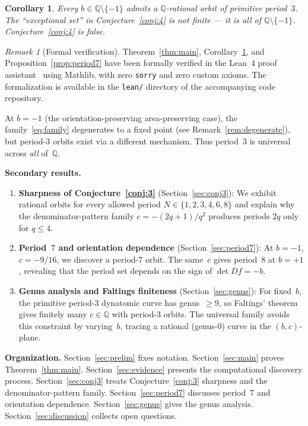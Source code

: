 \documentclass[11pt]{article}
\newtheorem{corollary}[theorem]{Corollary}
\theoremstyle{definition}
\theoremstyle{remark}
\newtheorem{remark}[theorem]{Remark}
\begin{document}
\begin{corollary}\label{cor:conj4false}
  Every $b \in \mathbb{Q} \setminus \{-1\}$ admits a $\mathbb{Q}$-rational orbit
  of primitive period~$3$.  The ``exceptional set'' in Conjecture~\ref{conj:4} is not
  finite --- it is all of $\mathbb{Q} \setminus \{-1\}$.
  Conjecture~\ref{conj:4} is false.
\end{corollary}

\begin{remark}[Formal verification]\label{rem:lean}
  Theorem~\ref{thm:main}, Corollary~\ref{cor:conj4false}, and
  Proposition~\ref{prop:period7} have been formally verified in the
  Lean~4 proof assistant~\cite{lean4} using Mathlib, with zero \texttt{sorry}
  and zero custom axioms.  The formalization is available in the
  \texttt{lean/} directory of the accompanying code repository.
\end{remark}

At $b = -1$ (the orientation-preserving area-preserving case),
the family~\eqref{eq:family} degenerates to a fixed point (see
Remark~\ref{rem:degenerate}), but period-$3$ orbits exist via a different mechanism.
Thus period~$3$ is universal across \emph{all} of~$\mathbb{Q}$.

\smallskip
\noindent\textbf{Secondary results.}
\begin{enumerate}
  \item \textbf{Sharpness of Conjecture~\ref{conj:3}}
  (Section~\ref{sec:conj3}):
  We exhibit rational orbits for every allowed period $N \in \{1,2,3,4,6,8\}$ and
  explain why the denominator-pattern family $c = -(2q+1)/q^2$ produces periods
  $2q$ only for $q \leq 4$.

  \item \textbf{Period~$7$ and orientation dependence}
  (Section~\ref{sec:period7}):
  At $b = -1$, $c = -9/16$, we discover a period-$7$ orbit.
  The same~$c$ gives period~$8$ at $b = +1$, revealing that the
  period set depends on the sign of $\det Df = -b$.

  \item \textbf{Genus analysis and Faltings finiteness}
  (Section~\ref{sec:genus}):
  For fixed~$b$, the primitive period-$3$ dynatomic curve has genus~$\geq 9$,
  so Faltings' theorem gives finitely many $c \in \mathbb{Q}$ with period-$3$ orbits.
  The universal family avoids this constraint by varying~$b$, tracing a rational
  (genus-$0$) curve in the $(b,c)$-plane.
\end{enumerate}

\smallskip
\noindent\textbf{Organization.}
Section~\ref{sec:prelim} fixes notation.
Section~\ref{sec:main} proves Theorem~\ref{thm:main}.
Section~\ref{sec:evidence} presents the computational discovery process.
Section~\ref{sec:conj3} treats Conjecture~\ref{conj:3} sharpness and the
denominator-pattern family.
Section~\ref{sec:period7} discusses period~$7$ and orientation dependence.
Section~\ref{sec:genus} gives the genus analysis.
Section~\ref{sec:discussion} collects open questions.
\end{document}
